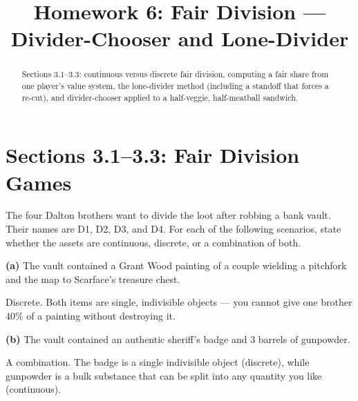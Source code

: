 \documentclass[12pt]{ximera}
\title{Homework 6: Fair Division --- Divider-Chooser and Lone-Divider}
\begin{document}
\begin{abstract}
Sections 3.1--3.3: continuous versus discrete fair division, computing a fair share
from one player's value system, the lone-divider method (including a standoff that
forces a re-cut), and divider-chooser applied to a half-veggie, half-meatball
sandwich.
\end{abstract}
\maketitle

\section*{Sections 3.1--3.3: Fair Division Games}

\begin{problem}
The four Dalton brothers want to divide the loot after robbing a bank vault. Their
names are D1, D2, D3, and D4. For each of the following scenarios, state whether the
assets are continuous, discrete, or a combination of both.

\begin{prompt}
\textbf{(a)} The vault contained a Grant Wood painting of a couple wielding a pitchfork
and the map to Scarface's treasure chest.

\begin{multipleChoice}
\end{multipleChoice}

\begin{feedback}
Discrete. Both items are single, indivisible objects --- you cannot give one brother
$40\%$ of a painting without destroying it.
\end{feedback}
\end{prompt}

\begin{prompt}
\textbf{(b)} The vault contained an authentic sheriff's badge and $3$ barrels of
gunpowder.

\begin{multipleChoice}
\end{multipleChoice}

\begin{feedback}
A combination. The badge is a single indivisible object (discrete), while gunpowder
is a bulk substance that can be split into any quantity you like (continuous).
\end{feedback}
\end{prompt}


\end{problem}
\end{document}
